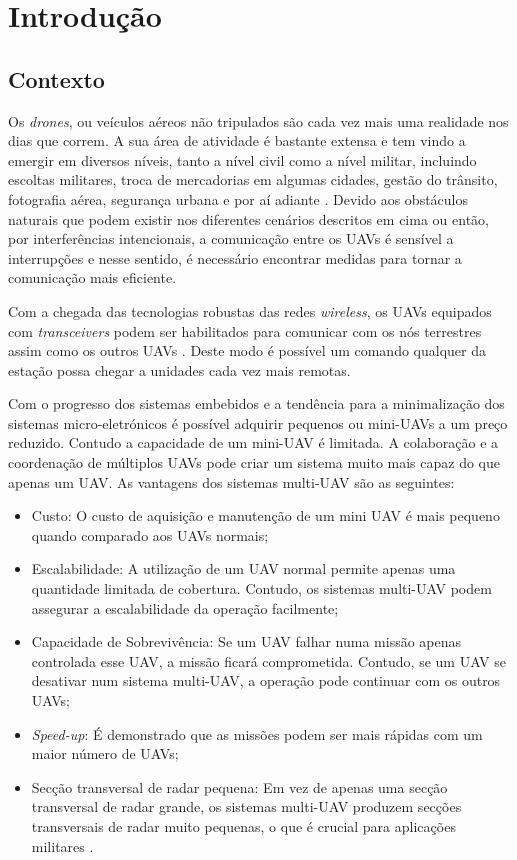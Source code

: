 \chapter{Introdução} \label{chap:intro}

\section{Contexto} \label{sec:context}

Os \textit{drones}, ou veículos aéreos não tripulados são cada vez mais uma realidade nos dias que correm. A sua área de atividade é bastante extensa e tem vindo a emergir em diversos níveis, tanto a nível civil como a nível militar, incluindo escoltas militares, troca de mercadorias em algumas cidades, gestão do trânsito, fotografia aérea, segurança urbana e por aí adiante \cite{8255738}. Devido aos obstáculos naturais que podem existir nos diferentes cenários descritos em cima ou então, por interferências intencionais, a comunicação entre os UAVs é sensível a interrupções \cite{Secinti2018} e nesse sentido, é necessário encontrar medidas para tornar a comunicação mais eficiente.

Com a chegada das tecnologias robustas das redes \textit{wireless}, os UAVs equipados com \textit{transceivers} podem ser habilitados para comunicar com os nós terrestres assim como os outros UAVs \cite{Morgenthaler2012a}. Deste modo é possível um comando qualquer da estação possa chegar a unidades cada vez mais remotas.

Com o progresso dos sistemas embebidos e a tendência para a minimalização dos sistemas micro-eletrónicos é possível adquirir pequenos ou mini-UAVs a um preço reduzido. Contudo a capacidade de um mini-UAV é limitada. A colaboração e a coordenação de múltiplos UAVs pode criar um sistema muito mais capaz do que apenas um UAV. As vantagens dos sistemas multi-UAV são as seguintes:
  \begin{itemize}
    \item{Custo: O custo de aquisição e manutenção de um mini UAV é mais pequeno quando comparado aos UAVs normais;}
    \item {Escalabilidade: A utilização de um UAV normal permite apenas uma quantidade limitada de cobertura. Contudo, os sistemas multi-UAV podem assegurar a escalabilidade da operação facilmente; }
    \item{ Capacidade de Sobrevivência: Se um UAV falhar numa missão apenas controlada esse UAV, a missão ficará comprometida. Contudo, se um UAV se desativar num sistema multi-UAV, a operação pode continuar com os outros UAVs;}
    \item{\textit{Speed-up}: É demonstrado que as missões podem ser mais rápidas com um maior número de UAVs;}
    \item{ Secção transversal de radar pequena: Em vez de apenas uma secção transversal de radar grande, os sistemas multi-UAV produzem secções transversais de radar muito pequenas, o que é crucial para aplicações militares \cite{Bekmezci2013a}.}
  \end{itemize}
  
